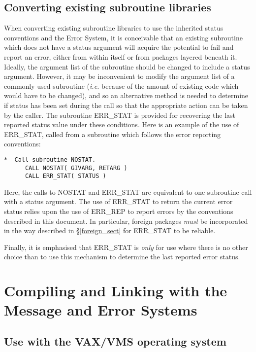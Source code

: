 \subsection {Converting existing subroutine libraries} \label{convert_sect}

When converting existing subroutine
libraries to use the inherited status conventions and the Error System,
it is conceivable that an existing subroutine which does not have a
status argument will acquire the potential to fail and report an error, either 
from within itself or from packages layered beneath it.
Ideally, the argument list of the subroutine should be changed to include a
status argument.
However, 
it may be inconvenient to modify the argument list of a commonly used
subroutine ({\em i.e.} because of the amount of existing code which would have
to be changed), and so an alternative method is needed to determine if status
has  been set during the
call so that the appropriate action can be taken by the caller.
The subroutine ERR\_STAT is provided for recovering the last reported status
value under these conditions.
Here is an example of the use of ERR\_STAT, called from a subroutine which
follows the error reporting conventions:

\begin {small}
\begin{verbatim}
*  Call subroutine NOSTAT.
      CALL NOSTAT( GIVARG, RETARG )
      CALL ERR_STAT( STATUS )
\end{verbatim}
\end {small}

Here, the calls to NOSTAT and ERR\_STAT are equivalent to one subroutine call 
with a status argument.
The use of ERR\_STAT to return the current error status relies upon the use of
ERR\_REP to report errors by the conventions described in this document.
In particular, foreign packages {\em must} be incorporated in the way described
in \S\ref{foreign_sect} for ERR\_STAT to be reliable.

Finally, it is emphasised that ERR\_STAT is {\em only} for use where there is
no other choice than to use this mechanism to determine the last reported error
status.


\section {Compiling and Linking with the Message and Error Systems}
\label{comp_sect}

\subsection {Use with the VAX/VMS operating system}

